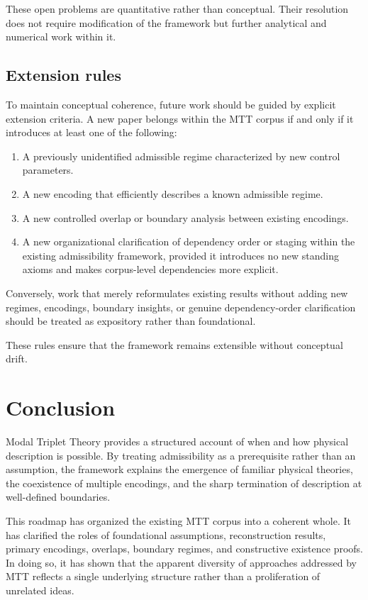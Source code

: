 \documentclass[11pt]{article}
\begin{document}
These open problems are quantitative rather than conceptual. Their resolution does not require modification of the framework but further analytical and numerical work within it.

\subsection{Extension rules}

To maintain conceptual coherence, future work should be guided by explicit extension criteria. A new paper belongs within the MTT corpus if and only if it introduces at least one of the following:

\begin{enumerate}
\item A previously unidentified admissible regime characterized by new control parameters.
\item A new encoding that efficiently describes a known admissible regime.
\item A new controlled overlap or boundary analysis between existing encodings.
\item A new organizational clarification of dependency order or staging within the existing admissibility framework, provided it introduces no new standing axioms and makes corpus-level dependencies more explicit.
\end{enumerate}

Conversely, work that merely reformulates existing results without adding new regimes, encodings, boundary insights, or genuine dependency-order clarification should be treated as expository rather than foundational.

These rules ensure that the framework remains extensible without conceptual drift.

\section{Conclusion}

Modal Triplet Theory provides a structured account of when and how physical description is possible. By treating admissibility as a prerequisite rather than an assumption, the framework explains the emergence of familiar physical theories, the coexistence of multiple encodings, and the sharp termination of description at well-defined boundaries.

This roadmap has organized the existing MTT corpus into a coherent whole. It has clarified the roles of foundational assumptions, reconstruction results, primary encodings, overlaps, boundary regimes, and constructive existence proofs. In doing so, it has shown that the apparent diversity of approaches addressed by MTT reflects a single underlying structure rather than a proliferation of unrelated ideas.
\end{document}
